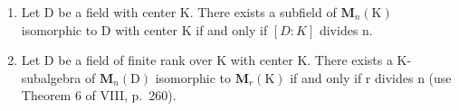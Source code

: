 
\begin{enumerate}
\def\labelenumi{\arabic{enumi})}
\item
  Let D be a field with center K. There exists a subfield of \(\mathbf{M}_{n}(\mathrm{K})\) isomorphic to D with center K if and only if \([D:K]\) divides n.
\item
  Let D be a field of finite rank over K with center K. There exists a K-subalgebra of \(\mathbf{M}_{n}(\mathrm{D})\) isomorphic to \(\mathbf{M}_{r}(\mathrm{K})\) if and only if r divides n (use Theorem 6 of VIII, p.~260).
\end{enumerate}

